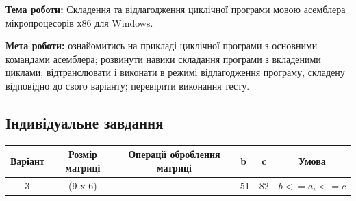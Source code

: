 \documentclass[12pt]{extarticle}
\begin{document}
\textbf{Тема роботи:} Складення та відлагодження циклічної програми мовою асемблера
        мікропроцесорів х86 для Windows.

\vspace{12pt}

\textbf{Мета роботи:} ознайомитись на прикладі циклічної програми з основними
командами асемблера; розвинути навики складання програми
з вкладеними циклами; відтранслювати і виконати в режимі
відлагодження програму, складену відповідно до свого
варіанту; перевірити виконання тесту.

\subsection*{Індивідуальне завдання}
\begin{center}
    \begin{tabular}{| c | c | c | c | c | c |}
        \hline
        Варіант & Розмір матриці & Операції оброблення матриці & b & c & Умова\\
        \hline
           3  & (9 x 6) & 

            & -51 &   82  &  $b <= a_i <= c$\\
        \hline
   
    \end{tabular}
\end{center}
\end{document}
